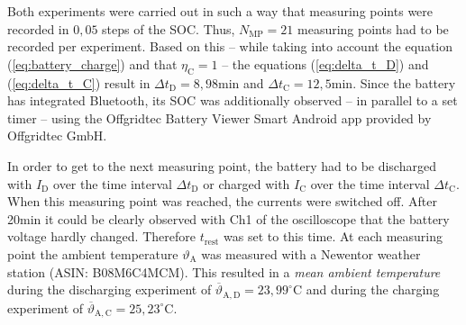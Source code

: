 Both experiments were carried out in such a way that measuring points were recorded in $0,05$ steps of the SOC. Thus, $N_\mathrm{MP} = 21$ measuring points had to be recorded per experiment. Based on this -- while taking into account the equation (\ref{eq:battery_charge}) and that $\eta_\mathrm{C} = 1$ -- the equations (\ref{eq:delta_t_D}) and (\ref{eq:delta_t_C}) result in $\Delta t_\mathrm{D} = 8,98\mathrm{min}$ and $\Delta t_\mathrm{C} = 12,5\mathrm{min}$. Since the battery has integrated Bluetooth, its SOC was additionally observed -- in parallel to a set timer -- using the Offgridtec Battery Viewer Smart Android app provided by Offgridtec GmbH.  
 
In order to get to the next measuring point, the battery had to be discharged with $I_\mathrm{D}$ over the time interval $\Delta t_\mathrm{D}$ or charged with $I_\mathrm{C}$ over the time interval $\Delta t_\mathrm{C}$. When this measuring point was reached, the currents were switched off. After 20min it could be clearly observed with Ch1 of the oscilloscope that the battery voltage hardly changed. Therefore $t_\mathrm{rest}$ was set to this time. At each measuring point the ambient temperature $\vartheta_\mathrm{A}$ was measured with a Newentor weather station (ASIN: B08M6C4MCM). This resulted in a \emph{mean ambient temperature} during the discharging experiment of $\overline{\vartheta}_\mathrm{A,D} = 23,99^\circ\mathrm{C}$ and during the charging experiment of $\overline{\vartheta}_\mathrm{A,C} = 25,23^\circ\mathrm{C}$.

